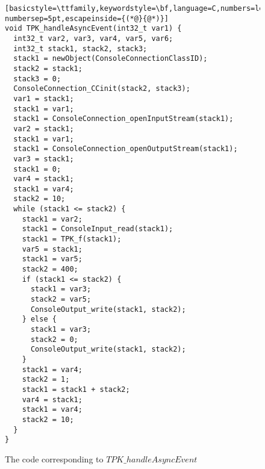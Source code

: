 \begin{figure}[tp!]
  \centering
  \setlength{\zedtab}{0.5cm}
  \setlength{\zedindent}{0pt}
  \setlength{\zedleftsep}{0pt}
  \setlength{\abovedisplayskip}{0pt}
  \setlength{\belowdisplayskip}{0pt}
  \setlength{\abovedisplayshortskip}{0pt}
  \setlength{\belowdisplayshortskip}{0pt}
  \begin{lstlisting}[basicstyle=\ttfamily,keywordstyle=\bf,language=C,numbers=left,numberstyle=\scriptsize,stepnumber=1, numbersep=5pt,escapeinside={(*@}{@*)}]
void TPK_handleAsyncEvent(int32_t var1) {
  int32_t var2, var3, var4, var5, var6;
  int32_t stack1, stack2, stack3;
  stack1 = newObject(ConsoleConnectionClassID);
  stack2 = stack1;
  stack3 = 0;
  ConsoleConnection_CCinit(stack2, stack3);
  var1 = stack1;
  stack1 = var1;
  stack1 = ConsoleConnection_openInputStream(stack1);
  var2 = stack1;
  stack1 = var1;
  stack1 = ConsoleConnection_openOutputStream(stack1);
  var3 = stack1;
  stack1 = 0;
  var4 = stack1;
  stack1 = var4;
  stack2 = 10;
  while (stack1 <= stack2) {
    stack1 = var2;
    stack1 = ConsoleInput_read(stack1);
    stack1 = TPK_f(stack1);
    var5 = stack1;
    stack1 = var5;
    stack2 = 400;
    if (stack1 <= stack2) {  
      stack1 = var3;
      stack2 = var5;
      ConsoleOutput_write(stack1, stack2);
    } else {
      stack1 = var3;
      stack2 = 0;
      ConsoleOutput_write(stack1, stack2);
    }
    stack1 = var4;
    stack2 = 1;
    stack1 = stack1 + stack2;
    var4 = stack1;
    stack1 = var4;
    stack2 = 10;
  }
}
\end{lstlisting}
  \caption{The code corresponding to $TPK\_handleAsyncEvent$}
  \label{efs-introduce-variables-c-code-figure}
\end{figure}